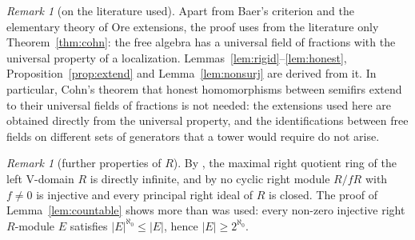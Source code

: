 \documentclass[11pt]{amsart}
\theoremstyle{plain}
\theoremstyle{definition}
\theoremstyle{remark}
\newtheorem{remark}[theorem]{Remark}
\begin{document}
\begin{remark}[on the literature used]
Apart from Baer's criterion and the elementary theory of Ore extensions, the proof uses from the literature only Theorem~\ref{thm:cohn}: the free algebra has a universal field of fractions with the universal property of a localization. Lemmas~\ref{lem:rigid}--\ref{lem:honest}, Proposition~\ref{prop:extend} and Lemma~\ref{lem:nonsurj} are derived from it. In particular, Cohn's theorem that honest homomorphisms between semifirs extend to their universal fields of fractions \cite[Theorem~4.5.10]{CohSF} is not needed: the extensions used here are obtained directly from the universal property, and the identifications between free fields on different sets of generators that a tower would require do not arise.
\end{remark}

\begin{remark}[further properties of $R$]
By \cite[Theorem~6.2]{JLL09}, the maximal right quotient ring of the left V-domain $R$ is directly infinite, and by \cite[Proposition~6.1]{JLL09} no cyclic right module $R/fR$ with $f\ne0$ is injective and every principal right ideal of $R$ is closed. The proof of Lemma~\ref{lem:countable} shows more than was used: every non-zero injective right $R$-module $E$ satisfies $|E|^{\aleph_0}\le|E|$, hence $|E|\ge2^{\aleph_0}$.
\end{remark}
\end{document}
